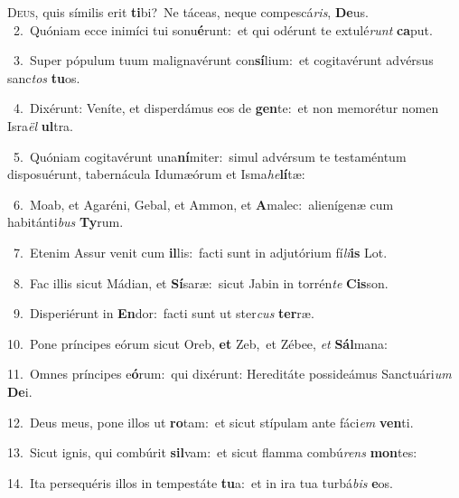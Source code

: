 \lettrine{\initial\textcolor{\initialcolor}{D}}{eus,} quis símilis erit \textbf{ti}\-bi?~\star Ne táceas, neque compescá\-\textit{ris}\-, \textbf{De}\-us.\\
{\numbfont\textcolor{\numbcolor}{~2.}}~Quóniam ecce inimíci tui sonu\-\textbf{é}\-runt:~\star et qui odérunt te extulé\textit{runt} \textbf{ca}\-put.\par
{\numbfont\textcolor{\numbcolor}{~3.}}~Super pópulum tuum malignavérunt con\-\textbf{sí}\-lium:~\star et cogitavérunt advérsus sanc\textit{tos} \textbf{tu}\-os.\par
{\numbfont\textcolor{\numbcolor}{~4.}}~Dixérunt: Veníte, et disperdámus eos de \textbf{gen}\-te:~\star et non memorétur nomen Isra\textit{ël} \textbf{ul}\-tra.\par
{\numbfont\textcolor{\numbcolor}{~5.}}~Quóniam cogitavérunt una\-\textbf{ní}\-miter:~\star simul advérsum te testaméntum disposuérunt, tabernácula Idumæórum et Isma\-\textit{he}\-\textbf{lí}tæ:\par
{\numbfont\textcolor{\numbcolor}{~6.}}~Moab, et Agaréni, Gebal, et Ammon, et \textbf{A}\-malec:~\star alienígenæ cum habitánti\textit{bus} \textbf{Ty}\-rum.\par
{\numbfont\textcolor{\numbcolor}{~7.}}~Etenim Assur venit cum \textbf{il}\-lis:~\star facti sunt in adjutórium fí\-\textit{li}\-\textbf{is} Lot.\par
{\numbfont\textcolor{\numbcolor}{~8.}}~Fac illis sicut Mádian, et \textbf{Sí}\-saræ:~\star sicut Jabin in torrén\textit{te} \textbf{Cis}\-son.\par
{\numbfont\textcolor{\numbcolor}{~9.}}~Disperiérunt in \textbf{En}\-dor:~\star facti sunt ut ster\textit{cus} \textbf{ter}\-ræ.\par
{\numbfont\textcolor{\numbcolor}{10.}}~Pone príncipes eórum sicut Oreb, \textbf{et} Zeb,~\star et Zébee, \textit{et} \textbf{Sál}\-mana:\par
{\numbfont\textcolor{\numbcolor}{11.}}~Omnes príncipes e\-\textbf{ó}\-rum:~\star qui dixérunt: Hereditáte possideámus Sanctuári\textit{um} \textbf{De}\-i.\par
{\numbfont\textcolor{\numbcolor}{12.}}~Deus meus, pone illos ut \textbf{ro}\-tam:~\star et sicut stípulam ante fáci\textit{em} \textbf{ven}\-ti.\par
{\numbfont\textcolor{\numbcolor}{13.}}~Sicut ignis, qui combúrit \textbf{sil}\-vam:~\star et sicut flamma combú\textit{rens} \textbf{mon}\-tes:\par
{\numbfont\textcolor{\numbcolor}{14.}}~Ita persequéris illos in tempestáte \textbf{tu}\-a:~\star et in ira tua turbá\textit{bis} \textbf{e}\-os.\par
